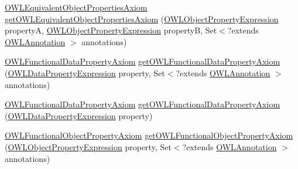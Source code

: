 \begin{DoxyCompactItemize}
\item 
\hyperlink{interfaceorg_1_1semanticweb_1_1owlapi_1_1model_1_1_o_w_l_equivalent_object_properties_axiom}{O\-W\-L\-Equivalent\-Object\-Properties\-Axiom} \hyperlink{classuk_1_1ac_1_1manchester_1_1cs_1_1owl_1_1owlapi_1_1_o_w_l_data_factory_impl_a2a3e5b5694192a7c3506891840fbbdaa}{get\-O\-W\-L\-Equivalent\-Object\-Properties\-Axiom} (\hyperlink{interfaceorg_1_1semanticweb_1_1owlapi_1_1model_1_1_o_w_l_object_property_expression}{O\-W\-L\-Object\-Property\-Expression} property\-A, \hyperlink{interfaceorg_1_1semanticweb_1_1owlapi_1_1model_1_1_o_w_l_object_property_expression}{O\-W\-L\-Object\-Property\-Expression} property\-B, Set$<$?extends \hyperlink{interfaceorg_1_1semanticweb_1_1owlapi_1_1model_1_1_o_w_l_annotation}{O\-W\-L\-Annotation} $>$ annotations)
\item 
\hyperlink{interfaceorg_1_1semanticweb_1_1owlapi_1_1model_1_1_o_w_l_functional_data_property_axiom}{O\-W\-L\-Functional\-Data\-Property\-Axiom} \hyperlink{classuk_1_1ac_1_1manchester_1_1cs_1_1owl_1_1owlapi_1_1_o_w_l_data_factory_impl_ad500523f292893d57287ae0973640d57}{get\-O\-W\-L\-Functional\-Data\-Property\-Axiom} (\hyperlink{interfaceorg_1_1semanticweb_1_1owlapi_1_1model_1_1_o_w_l_data_property_expression}{O\-W\-L\-Data\-Property\-Expression} property, Set$<$?extends \hyperlink{interfaceorg_1_1semanticweb_1_1owlapi_1_1model_1_1_o_w_l_annotation}{O\-W\-L\-Annotation} $>$ annotations)
\item 
\hyperlink{interfaceorg_1_1semanticweb_1_1owlapi_1_1model_1_1_o_w_l_functional_data_property_axiom}{O\-W\-L\-Functional\-Data\-Property\-Axiom} \hyperlink{classuk_1_1ac_1_1manchester_1_1cs_1_1owl_1_1owlapi_1_1_o_w_l_data_factory_impl_a27af039cf0106077a315db7aaff35377}{get\-O\-W\-L\-Functional\-Data\-Property\-Axiom} (\hyperlink{interfaceorg_1_1semanticweb_1_1owlapi_1_1model_1_1_o_w_l_data_property_expression}{O\-W\-L\-Data\-Property\-Expression} property)
\item 
\hyperlink{interfaceorg_1_1semanticweb_1_1owlapi_1_1model_1_1_o_w_l_functional_object_property_axiom}{O\-W\-L\-Functional\-Object\-Property\-Axiom} \hyperlink{classuk_1_1ac_1_1manchester_1_1cs_1_1owl_1_1owlapi_1_1_o_w_l_data_factory_impl_a7e61176f942e0e7b1d8b90bb070e6df1}{get\-O\-W\-L\-Functional\-Object\-Property\-Axiom} (\hyperlink{interfaceorg_1_1semanticweb_1_1owlapi_1_1model_1_1_o_w_l_object_property_expression}{O\-W\-L\-Object\-Property\-Expression} property, Set$<$?extends \hyperlink{interfaceorg_1_1semanticweb_1_1owlapi_1_1model_1_1_o_w_l_annotation}{O\-W\-L\-Annotation} $>$ annotations)

\end{DoxyCompactItemize}
